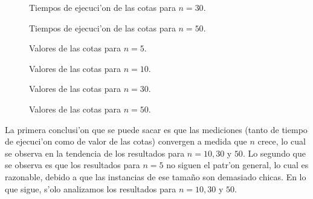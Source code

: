 \begin{figure}[h]
	
	
	\caption{Tiempos de ejecuci'on de las cotas para $n = 30$.}
	\label{fig:tiempos_30x30}
\end{figure}

\begin{figure}[h]
	\centering
	
	\caption{Tiempos de ejecuci'on de las cotas para $n = 50$.}
	\label{fig:tiempos_50x50}
\end{figure}

\begin{figure}[h]
\begin{minipage}[t]{0.45\textwidth}
	\centering
	
	\setcaptionwidth{5cm}
	\caption{Valores de las cotas para $n = 5$.}
	\label{fig:valores_5x5}
\end{minipage}%
\hfill%
\begin{minipage}[t]{0.45\textwidth}
	\centering
	
	\setcaptionwidth{5cm}
    \caption{Valores de las cotas para $n = 10$.}
	\label{fig:valores_10x10}
\end{minipage}

\begin{minipage}[t]{0.45\textwidth}
	\centering
	
	\setcaptionwidth{5cm}
	\caption{Valores de las cotas para $n = 30$.}
	\label{fig:valores_30x30}
\end{minipage}%
\hfill%
\begin{minipage}[t]{0.45\textwidth}
	\centering
	
	\setcaptionwidth{5cm}
    \caption{Valores de las cotas para $n = 50$.}
	\label{fig:valores_50x50}
\end{minipage}
\end{figure}

\clearpage

La primera conclusi'on que se puede sacar es que las mediciones (tanto de tiempo de ejecuci'on como de valor de las cotas) convergen a medida que $n$ crece, lo cual se observa en la tendencia de los resultados para $n = 10, 30$ y  $50$. Lo segundo que se observa es que los resultados para $n = 5$ no siguen el patr'on general, lo cual es razonable, debido a que las instancias de ese tama\~no son demasiado chicas. En lo que sigue, s'olo analizamos los resultados para $n = 10, 30$ y $50$.

